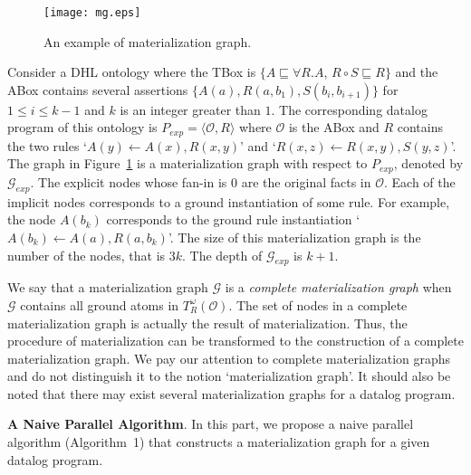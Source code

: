 \documentclass{article}
\begin{document}
\begin{figure}[htbp]
\begin{center}
\texttt{[image: mg.eps]}
\caption{An example of materialization graph.}
\label{fig:mg}
\end{center}
\end{figure}

\begin{example}\label{exp:mg}
Consider a DHL ontology where the TBox is $\{$$A\sqsubseteq\forall R.A$, $R\circ S\sqsubseteq R$$\}$ and the ABox contains several assertions $\{$$A(a),R(a,b_1),S(b_i,b_{i+1})$$\}$ for $1\leq i\leq k-1$ and $k$ is an integer greater than $1$. The corresponding datalog program of this ontology is $P_{exp}=\langle\mathcal{O}, R\rangle$ where $\mathcal{O}$ is the ABox and $R$ contains the two rules `$A(y)\leftarrow A(x),R(x,y)$' and `$R(x,z)\leftarrow R(x,y),S(y,z)$'. The graph in Figure~\ref{fig:mg} is a materialization graph with respect to $P_{exp}$, denoted by $\mathcal{G}_{exp}$. The explicit nodes whose fan-in is 0 are the original facts in $\mathcal{O}$. Each of the implicit nodes corresponds to a ground instantiation of some rule. For example, the node $A(b_k)$ corresponds to the ground rule instantiation `$A(b_k)\leftarrow A(a),R(a,b_k)$'. The size of this materialization graph is the number of the nodes, that is $3k$. The depth of $\mathcal{G}_{exp}$ is $k+1$.
\end{example}

We say that a materialization graph $\mathcal{G}$ is a \emph{complete materialization graph} when $\mathcal{G}$ contains all ground atoms in $T_R^{\omega}(\mathcal{O})$. The set of nodes in a complete materialization graph is actually the result of materialization. Thus, the procedure of materialization
can be transformed to the construction of a complete materialization graph. We pay our attention to complete materialization graphs and do not distinguish it to the notion `materialization graph'. It should also be noted that there may exist several materialization graphs for a datalog program.

\textbf{A Naive Parallel Algorithm}. In this part, we propose a naive parallel algorithm (Algorithm~1) that constructs a materialization graph for a given datalog program.\\
\end{document}
